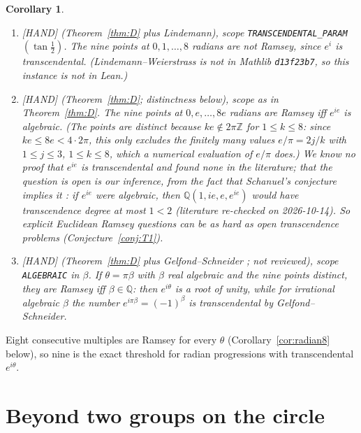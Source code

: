 \documentclass[11pt]{amsart}
\newcommand{\st}[1]{\textsf{[#1]}}
\newcommand{\Q}{\mathbb{Q}}
\theoremstyle{plain}
\newtheorem{corollary}[theorem]{Corollary}
\theoremstyle{definition}
\begin{document}
\begin{corollary}\label{cor:radian}
\begin{enumerate}
\item \st{HAND} (Theorem~\ref{thm:D} plus Lindemann), scope \texttt{TRANSCENDENTAL\_}\allowbreak\texttt{PARAM}$(\tan\tfrac12)$.
The nine points at $0,1,\dots,8$ radians are not Ramsey, since $e^{i}$ is transcendental.
(Lindemann--Weierstrass is not in Mathlib \texttt{d13f23b7}, so this instance is not in Lean.)
\item \st{HAND} (Theorem~\ref{thm:D}; distinctness below), scope as in Theorem~\ref{thm:D}.
The nine points at $0,e,\dots,8e$ radians are Ramsey iff $e^{ie}$ is algebraic. (The points are
distinct because $ke\notin2\pi\mathbb Z$ for $1\le k\le8$: since $ke\le8e<4\cdot2\pi$, this only
excludes the finitely many values $e/\pi=2j/k$ with $1\le j\le3$, $1\le k\le8$, which a numerical
evaluation of $e/\pi$ does.) We know no
proof that $e^{ie}$ is transcendental and found none in the literature; that the question is open is
our inference, from the fact that Schanuel's conjecture implies it \cite[\S3.1]{Waldschmidt}: if
$e^{ie}$ were algebraic, then $\Q(1,ie,e,e^{ie})$ would have transcendence degree at most $1<2$
(literature re-checked on 2026-10-14). So explicit Euclidean Ramsey questions can be as hard as open
transcendence problems (Conjecture~\ref{conj:T1}).
\item \st{HAND} (Theorem~\ref{thm:D} plus Gelfond--Schneider \cite{Baker}; not reviewed), scope
\texttt{ALGEBRAIC} in $\beta$. If $\theta=\pi\beta$ with $\beta$ real algebraic and the nine points
distinct, they are Ramsey iff $\beta\in\Q$: then $e^{i\theta}$ is a root of unity, while for irrational
algebraic $\beta$ the number $e^{i\pi\beta}=(-1)^\beta$ is transcendental by Gelfond--Schneider.
\end{enumerate}
\end{corollary}

Eight consecutive multiples are Ramsey for every $\theta$ (Corollary~\ref{cor:radian8} below), so nine is
the exact threshold for radian progressions with transcendental $e^{i\theta}$.

\section{Beyond two groups on the circle}\label{sec:beyond}
\end{document}

